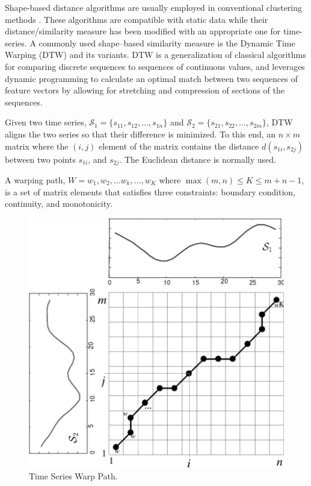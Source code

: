 Shape-based distance algorithms are usually employed in conventional clustering methods \cite{Pal2017}. These algorithms  are compatible with static data while their distance/similarity measure has been modified with an appropriate one for time-series. A commonly used shape--based similarity measure is the Dynamic Time Warping (DTW) \cite{Sakoe1978} and its variants. DTW is a generalization of classical algorithms for comparing discrete sequences to sequences of continuous values, and leverages dynamic programming to calculate an optimal match between two sequences of feature vectors by allowing for stretching and compression of sections of the sequences. 

Given two time series, $\mathcal{S}_{1} =\{s_{11}, s_{12}, \ldots, s_{1n}\}$ and $\mathcal{S}_{2} = \{s_{21}, s_{22}, \ldots, s_{2m}\}$, DTW aligns the two series so that their difference is minimized. To this end, an $n \times m$ matrix where the $(i, j)$ element of the matrix contains the distance $d(s_{1i}, s_{2j})$ between two points $s_{1i}$, and $s_{2j}$. The Euclidean distance is normally used. 

A warping path, $W = w_{1} , w_{2}, \ldots w_{k}, \ldots, w_{K}$ where $\max(m, n) \leq K \leq m + n-1$, is a set of matrix elements that satisfies three constraints: boundary condition, continuity, and monotonicity. 

\begin{figure}[htb]
	\centering
	\includegraphics[scale=0.5]{../Figures/DTW-WarpPath}
	\caption{Time Series Warp Path.}
	\label{Fig:DTW_warp_path}
\end{figure}


